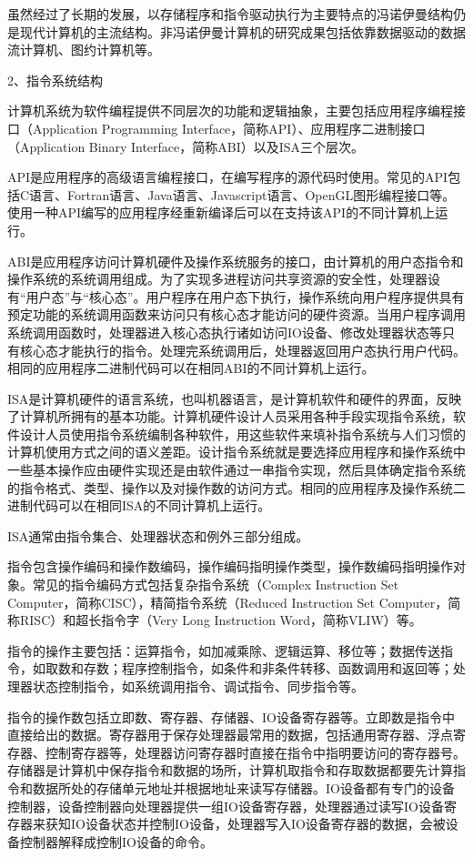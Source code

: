 \documentclass[]{ctexbook}
\begin{document}
虽然经过了长期的发展，以存储程序和指令驱动执行为主要特点的冯诺伊曼结构仍是现代计算机的主流结构。非冯诺伊曼计算机的研究成果包括依靠数据驱动的数据流计算机、图约计算机等。

2、指令系统结构

计算机系统为软件编程提供不同层次的功能和逻辑抽象，主要包括应用程序编程接口（Application Programming Interface，简称API）、应用程序二进制接口（Application Binary Interface，简称ABI）以及ISA三个层次。

API是应用程序的高级语言编程接口，在编写程序的源代码时使用。常见的API包括C语言、Fortran语言、Java语言、Javascript语言、OpenGL图形编程接口等。使用一种API编写的应用程序经重新编译后可以在支持该API的不同计算机上运行。

ABI是应用程序访问计算机硬件及操作系统服务的接口，由计算机的用户态指令和操作系统的系统调用组成。为了实现多进程访问共享资源的安全性，处理器设有``用户态''与``核心态''。用户程序在用户态下执行，操作系统向用户程序提供具有预定功能的系统调用函数来访问只有核心态才能访问的硬件资源。当用户程序调用系统调用函数时，处理器进入核心态执行诸如访问IO设备、修改处理器状态等只有核心态才能执行的指令。处理完系统调用后，处理器返回用户态执行用户代码。相同的应用程序二进制代码可以在相同ABI的不同计算机上运行。

ISA是计算机硬件的语言系统，也叫机器语言，是计算机软件和硬件的界面，反映了计算机所拥有的基本功能。计算机硬件设计人员采用各种手段实现指令系统，软件设计人员使用指令系统编制各种软件，用这些软件来填补指令系统与人们习惯的计算机使用方式之间的语义差距。设计指令系统就是要选择应用程序和操作系统中一些基本操作应由硬件实现还是由软件通过一串指令实现，然后具体确定指令系统的指令格式、类型、操作以及对操作数的访问方式。相同的应用程序及操作系统二进制代码可以在相同ISA的不同计算机上运行。

ISA通常由指令集合、处理器状态和例外三部分组成。

指令包含操作编码和操作数编码，操作编码指明操作类型，操作数编码指明操作对象。常见的指令编码方式包括复杂指令系统（Complex Instruction Set Computer，简称CISC），精简指令系统（Reduced Instruction Set Computer，简称RISC）和超长指令字（Very Long Instruction Word，简称VLIW）等。

指令的操作主要包括：运算指令，如加减乘除、逻辑运算、移位等；数据传送指令，如取数和存数；程序控制指令，如条件和非条件转移、函数调用和返回等；处理器状态控制指令，如系统调用指令、调试指令、同步指令等。

指令的操作数包括立即数、寄存器、存储器、IO设备寄存器等。立即数是指令中直接给出的数据。寄存器用于保存处理器最常用的数据，包括通用寄存器、浮点寄存器、控制寄存器等，处理器访问寄存器时直接在指令中指明要访问的寄存器号。存储器是计算机中保存指令和数据的场所，计算机取指令和存取数据都要先计算指令和数据所处的存储单元地址并根据地址来读写存储器。IO设备都有专门的设备控制器，设备控制器向处理器提供一组IO设备寄存器，处理器通过读写IO设备寄存器来获知IO设备状态并控制IO设备，处理器写入IO设备寄存器的数据，会被设备控制器解释成控制IO设备的命令。
\end{document}
